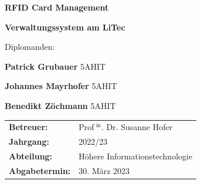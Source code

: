 \begin{titlepage}


\vspace*{5cm}

{
\color{litec-blue}
\noindent
\Huge\textbf{RFID Card Management}

\vspace{0.2cm}
\noindent
\huge\textbf{Verwaltungssystem am LiTec}
}

\vspace*{4cm}
\begin{spacing}{1.5}
\Large
\hfill Diplomanden:\par

\vspace{0.5cm}
\hfill\textbf{Patrick Grubauer}   \hspace{1cm}5AHIT\par
\hfill\textbf{Johannes Mayrhofer} \hspace{1cm}5AHIT\par
\hfill\textbf{Benedikt Zöchmann}  \hspace{1cm}5AHIT
\end{spacing}

\vfill

{
\hspace{-1cm}
\renewcommand{\arraystretch}{1.5}
\Large
\begin{tabular}{ll}
     \textbf{Betreuer:} & Prof$^\text{ in}$. Dr. Susanne Hofer\\
     \textbf{Jahrgang:} & 2022/23\\
     \textbf{Abteilung:} & Höhere Informationstechnologie\\
     \textbf{Abgabetermin:} & 30. März 2023
\end{tabular}
}

\end{titlepage}

